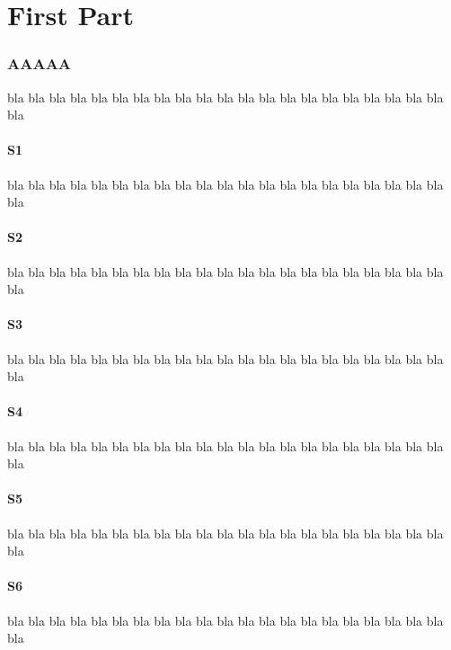 \documentclass[12pt,a4paper]{article}
\begin{document}
\dosecttoc
\dosectlof[c]                   %
\doparttoc                      %
\dopartlof                      %
\tableofcontents            %
\fakelistoffigures              %
\part{First Part}
\parttoc
\partlof[r]
\twocolumn                      %
\section{AAAAA}                 %
\secttoc[r]                     %
bla bla bla bla bla bla bla bla bla bla bla
bla bla bla bla bla bla bla bla bla bla bla
\subsection{S1}
bla bla bla bla bla bla bla bla bla bla bla
bla bla bla bla bla bla bla bla bla bla bla
\subsection{S2}
bla bla bla bla bla bla bla bla bla bla bla
bla bla bla bla bla bla bla bla bla bla bla
\subsection{S3}
bla bla bla bla bla bla bla bla bla bla bla
bla bla bla bla bla bla bla bla bla bla bla
\subsection*{S4}
bla bla bla bla bla bla bla bla bla bla bla
bla bla bla bla bla bla bla bla bla bla bla
\subsection{S5}
bla bla bla bla bla bla bla bla bla bla bla
bla bla bla bla bla bla bla bla bla bla bla
\subsection{S6}
bla bla bla bla bla bla bla bla bla bla bla
bla bla bla bla bla bla bla bla bla bla bla
\end{document}
